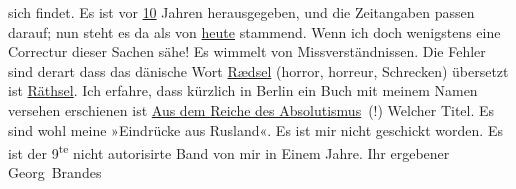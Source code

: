 \begin{ledgroupsized}[t]{13cm}
               sich
                    findet. Es ist vor \uline{10} Jahren herausgegeben, und
                    die Zeitangaben passen darauf; nun steht es da als von \uline{heute}
               stammend. Wenn
                    ich doch wenigstens eine Correctur dieser Sachen sähe! Es wimmelt von
                    Missverständnissen. Die Fehler sind derart dass das dänische Wort \uline{Rædsel} (horror,
                    horreur, Schrecken) übersetzt ist \uline{Räthsel}.\hspace*{5em} Ich erfahre, dass kürzlich in Berlin ein Buch mit meinem Namen versehen erschienen ist
                        \uline{Aus dem Reiche des Absolutismus} (!)
                    Welcher Titel. Es sind wohl meine »Eindrücke aus
                        Rusland«. Es ist mir nicht geschickt worden. \introOben{}Es ist
                        der 9\textsuperscript{te} nicht autorisirte Band von mir in Einem
                        Jahre.\introOben{}\pend
           \pstart Ihr ergebener \spacefill\mbox{Georg Brandes}\pend{}\endnumbering{}\end{ledgroupsized}  \newcommand{\dateiname}{L00600}\newcommand{\titel}{Georg Brandes an Arthur Schnitzler, 6. 10. 1896}\newcommand{\editorInnen}{Martin Anton Müller und Gerd-Hermann Susen}
      